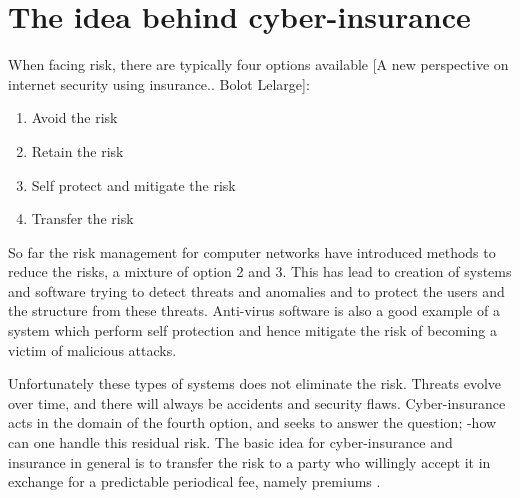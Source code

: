  \section{The idea behind cyber-insurance}
When facing risk, there are typically four options available [A new perspective on internet security using insurance.. Bolot Lelarge]:
\begin{enumerate}
\item Avoid the risk
\item Retain the risk
\item Self protect and mitigate the risk
\item Transfer the risk
\end{enumerate}
So far the risk management for computer networks have introduced methods to reduce the risks, 
a mixture of option 2 and 3. This has lead to creation of systems and software trying to detect threats and anomalies and to protect the users and the structure from these threats. Anti-virus software is also a good example of a system which perform self protection and hence mitigate the risk of becoming a victim of malicious attacks.

Unfortunately these types of systems does not eliminate the risk. Threats evolve over time, and there will always be accidents and security flaws. Cyber-insurance acts in the domain of the fourth option, and seeks to answer the question; -how can one handle this residual risk. The basic idea for cyber-insurance and insurance in general is to transfer the risk to a party who willingly accept it in exchange for a predictable periodical fee, namely premiums \cite{bolot2008cyber}. 
   
